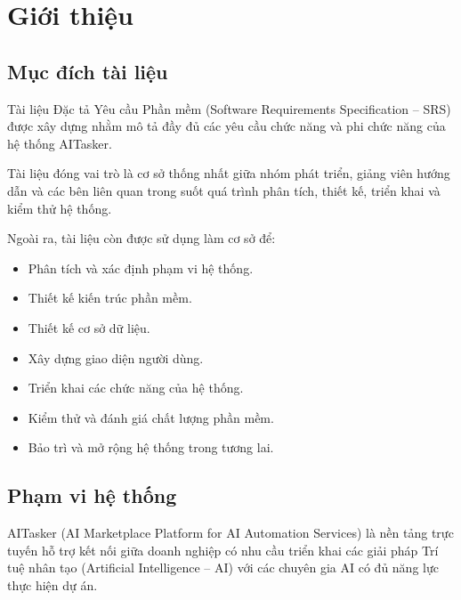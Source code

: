 \chapter{Giới thiệu}

\section{Mục đích tài liệu}

Tài liệu Đặc tả Yêu cầu Phần mềm (Software Requirements Specification -- SRS)
được xây dựng nhằm mô tả đầy đủ các yêu cầu chức năng và phi chức năng của hệ
thống AITasker.

Tài liệu đóng vai trò là cơ sở thống nhất giữa nhóm phát triển, giảng viên hướng
dẫn và các bên liên quan trong suốt quá trình phân tích, thiết kế, triển khai và
kiểm thử hệ thống.

Ngoài ra, tài liệu còn được sử dụng làm cơ sở để:

\begin{itemize}

\item Phân tích và xác định phạm vi hệ thống.

\item Thiết kế kiến trúc phần mềm.

\item Thiết kế cơ sở dữ liệu.

\item Xây dựng giao diện người dùng.

\item Triển khai các chức năng của hệ thống.

\item Kiểm thử và đánh giá chất lượng phần mềm.

\item Bảo trì và mở rộng hệ thống trong tương lai.

\end{itemize}


\section{Phạm vi hệ thống}

AITasker (AI Marketplace Platform for AI Automation Services) là nền tảng trực
tuyến hỗ trợ kết nối giữa doanh nghiệp có nhu cầu triển khai các giải pháp Trí tuệ
nhân tạo (Artificial Intelligence -- AI) với các chuyên gia AI có đủ năng lực thực
hiện dự án.

